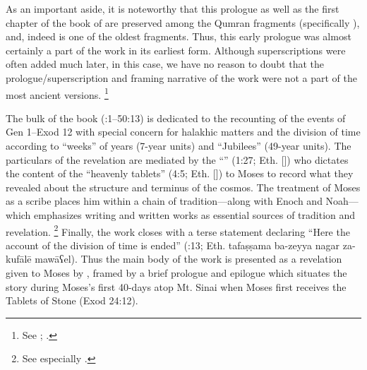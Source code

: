 %
\noindent
As an important aside, it is noteworthy that this prologue as well as the first chapter of the book of \jub are preserved among the Qumran fragments (specifically ), and, indeed  is one of the oldest \jub fragments. Thus, this early prologue was almost certainly a part of the work in its earliest form. Although superscriptions were often added much later, in this case, we have no reason to doubt that the prologue/superscription and framing narrative of the work were not a part of the most ancient versions.%
    \footnote{See 
        \cite[1:125]{vanderkam2018};
        \cite[25]{vanderkam_metso-etal2010}.}

The bulk of the book (:1--50:13) is dedicated to the recounting of the events of Gen 1--Exod 12 with special concern for halakhic matters and the division of time according to ``weeks'' of years (7-year units) and ``Jubilees'' (49-year units). The particulars of the revelation are mediated by the ``\ap'' (1:27; Eth.  []) who dictates the content of the ``heavenly tablets'' (4:5; Eth.  []) to Moses to record what they revealed about the structure and terminus of the cosmos.\autocite{martinez_najman-tigchelaar2012} The treatment of Moses as a scribe places him within a chain of tradition---along with Enoch and Noah---which emphasizes writing and written works as essential sources of tradition and revelation.%
        \footnote{See especially
                \cite[381--388]{najman_jsj1999}.} 
Finally, the work closes with a terse statement declaring ``Here the account of the division of time is ended'' (:13; Eth. 
        {tafaṣṣama ba-zeyya nagar za-kufālē mawāʕel}).
Thus the main body of the work is presented as a revelation given to Moses by \yahweh, framed by a brief prologue and epilogue which situates the story during Moses's first 40-days atop Mt. Sinai when Moses first receives the Tablets of Stone (Exod 24:12).\autocite[1:129]{vanderkam2018}


